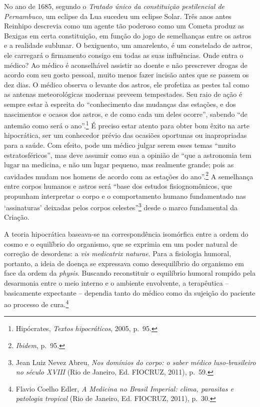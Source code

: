 No ano de 1685, segundo o \emph{Tratado único da constituição
pestilencial de Pernambuco}, um eclipse da Lua sucedeu um eclipse Solar.
Três anos antes Reinhipo descrevia como um agente tão poderoso como um
Cometa produz as Bexigas em certa constituição, em função do jogo de
semelhanças entre os astros e a realidade sublunar. O bexiguento, um
amarelento, é um constelado de astros, ele carregará o firmamento
consigo em todas as suas influências. Onde entra o médico? Ao médico é
aconselhável assistir ao doente e não prescrever drogas de acordo com
seu gosto pessoal, muito menos fazer incisão antes que se passem os dez
dias. O médico observa o levante dos astros, ele profetiza as pestes tal
como as antenas meteorológicas modernas preveem tempestades. Seu raio de
ação é sempre estar à espreita do ``conhecimento das mudanças das
estações, e dos nascimentos e ocasos dos astros, e de como cada um deles
ocorre'', sabendo ``de antemão como será o ano''.\footnote{Hipócrates,
  \emph{Textos hipocráticos}, 2005, p.~95.} É preciso estar atento para
obter bom êxito na arte hipocrática, ser um conhecedor prévio das
ocasiões oportunas ou inapropriadas para a saúde. Com efeito, pode um
médico julgar serem esses temas ``muito estratosféricos'', mas deve
assumir como sua a opinião de ``que a astronomia tem lugar na medicina,
e não um lugar pequeno, mas realmente grande; pois as cavidades mudam
nos homens de acordo com as estações do ano''.\footnote{\emph{Ibidem},
  p.~95.} A semelhança entre corpos humanos e astros será ``base dos
estudos fisiognomônicos, que propunham interpretar o corpo e o
comportamento humano fundamentado nas `assinaturas' deixadas pelos
corpos celestes''\footnote{Jean Luiz Nevez Abreu, \emph{Nos domínios do
  corpo: o saber médico luso-brasileiro no século XVIII} (Rio de
  Janeiro, Ed. FIOCRUZ, 2011), p.~59.} desde o marco fundamental da
Criação.

A teoria hipocrática baseava-se na correspondência isomórfica entre a
ordem do cosmo e o equilíbrio do organismo, que se exprimia em um poder
natural de correção de desordens: a \emph{vis medicatrix naturae}. Para
a fisiologia humoral, portanto, a ideia de doença se expressava como
desequilíbrio do organismo em face da ordem da \emph{physis}. Buscando
reconstituir o equilíbrio humoral rompido pela desarmonia entre o meio
interno e o ambiente envolvente, a terapêutica -- basicamente expectante
-- dependia tanto do médico como da sujeição do paciente ao processo de
cura.\footnote{Flavio Coelho Edler, \emph{A Medicina no Brasil Imperial:
  clima, parasitas e patologia tropical} (Rio de Janeiro, Ed. FIOCRUZ,
  2011), p.~30.}

